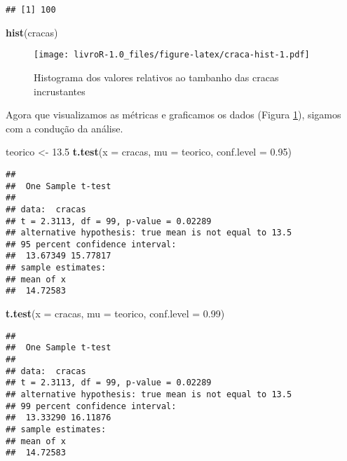 \documentclass[titlepage, oneside, openany, a4paper]{book}
\newenvironment{Shaded}{\begin{snugshade}}{\end{snugshade}}
\newcommand{\DataTypeTok}[1]{\textcolor[rgb]{0.13,0.29,0.53}{#1}}
\newcommand{\FloatTok}[1]{\textcolor[rgb]{0.00,0.00,0.81}{#1}}
\newcommand{\KeywordTok}[1]{\textcolor[rgb]{0.13,0.29,0.53}{\textbf{#1}}}
\newcommand{\NormalTok}[1]{#1}
\newcommand{\StringTok}[1]{\textcolor[rgb]{0.31,0.60,0.02}{#1}}
\begin{document}
\begin{verbatim}
## [1] 100
\end{verbatim}

\begin{Shaded}
\begin{Highlighting}[]
\KeywordTok{hist}\NormalTok{(cracas)}
\end{Highlighting}
\end{Shaded}

\begin{figure}
\centering
\texttt{[image: livroR-1.0\_files/figure-latex/craca-hist-1.pdf]}
\caption{\label{fig:craca-hist}Histograma dos valores relativos ao tambanho das cracas incrustantes}
\end{figure}

Agora que visualizamos as métricas e graficamos os dados (Figura \ref{fig:craca-hist}), sigamos com a condução da análise.

\begin{Shaded}
\begin{Highlighting}[]
\NormalTok{teorico <-}\StringTok{ }\FloatTok{13.5}
\KeywordTok{t.test}\NormalTok{(}\DataTypeTok{x =}\NormalTok{ cracas, }\DataTypeTok{mu =}\NormalTok{ teorico, }\DataTypeTok{conf.level =} \FloatTok{0.95}\NormalTok{)}
\end{Highlighting}
\end{Shaded}

\begin{verbatim}
## 
##  One Sample t-test
## 
## data:  cracas
## t = 2.3113, df = 99, p-value = 0.02289
## alternative hypothesis: true mean is not equal to 13.5
## 95 percent confidence interval:
##  13.67349 15.77817
## sample estimates:
## mean of x 
##  14.72583
\end{verbatim}

\begin{Shaded}
\begin{Highlighting}[]
\KeywordTok{t.test}\NormalTok{(}\DataTypeTok{x =}\NormalTok{ cracas, }\DataTypeTok{mu =}\NormalTok{ teorico, }\DataTypeTok{conf.level =} \FloatTok{0.99}\NormalTok{)}
\end{Highlighting}
\end{Shaded}

\begin{verbatim}
## 
##  One Sample t-test
## 
## data:  cracas
## t = 2.3113, df = 99, p-value = 0.02289
## alternative hypothesis: true mean is not equal to 13.5
## 99 percent confidence interval:
##  13.33290 16.11876
## sample estimates:
## mean of x 
##  14.72583
\end{verbatim}
\end{document}

